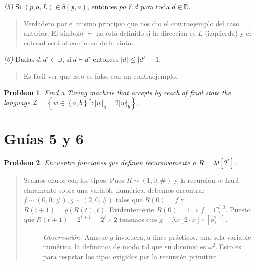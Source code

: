 \documentclass[a4paper, 12pt]{article}
\newtheorem{problem}{Problem}
\newtheorem{problem}{Problem}
\begin{document}
\textit{(5)} Si $(p, a, L) \in \delta(p, a)$, entonces $pa \not\vdash d$ para
toda $d \in \mathbb{D}$.


\small
\begin{quote}

Verdadero por el mismo principio que nos dio el contraejemplo del caso anterior.
El símbolo $\vdash $ no está definido si la dirección es $L$ (izquierda) y el
cabezal está al comienzo de la cinta.

\end{quote}
\normalsize

\textit{(6)} Dadas $d, d' \in \mathbb{D}$, si $d \vdash d'$ entonces $|d| \leq
|d'| + 1$.


\small
\begin{quote}

Es fácil ver que esto es falso con un contraejemplo.

\end{quote}
\normalsize

\begin{problem}
    Find a Turing machine that accepts by reach of final state the language
    $\mathscr{L} = \left\{ w \in \left\{ a, b \right\}^{*} : |w|_a = 2|w|_b
    \right\} $.
\end{problem}












\pagebreak

\section{Guías 5 y 6}

\begin{problem}
    Encuentre funciones que definan recursivamente a $R = \lambda t \left[  2^t
    \right]$.
\end{problem}


\small
\begin{quote}

Seamos claros con los tipos. Pues $R \sim (1, 0, \#)$ y la recursión se hará
claramente sobre una variable numérica, debemos encontrar $f \sim (0, 0, \#), g
\sim (2, 0, \#)$ tales que $R(0) = f$ y $R(t + 1) = g\left( R(t), t \right) $.
Evidentemente $R(0) = 1 \Rightarrow f = C_1^{0, 0}$. Puesto que $R(t + 1) = 2^{t
+ 1} = 2^t \times 2$ tenemos que $g = \lambda x \left[  2\cdot x \right] \circ
\left[ p_1^{2, 0} \right] $. 

\begin{quote}
    \textit{Observación.} Aunque $g$ involucra, a fines prácticos, una sola variable
    numérica, la definimos de modo tal que su dominio es $\omega^2$. Esto es
    para respetar los tipos exigidos por la recursión primitiva.
\end{quote}

\end{quote}
\normalsize
\end{document}
